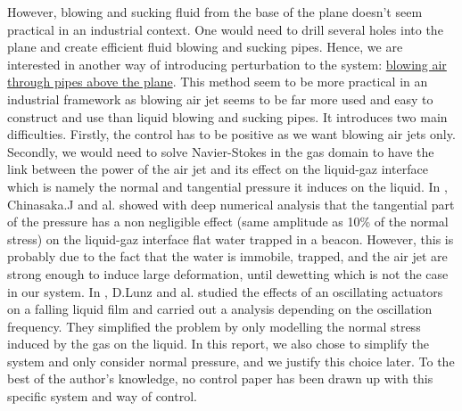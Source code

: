 \documentclass[12pt]{article}
\begin{document}
However, blowing and sucking fluid from the base of the plane doesn't seem practical in an industrial context. One would need to drill several holes into the plane and create efficient fluid blowing and sucking pipes. Hence, we are interested in another way of introducing perturbation to the system: \underline{blowing air through pipes above the plane}. This method seem to be more practical in an industrial framework as blowing air jet seems to be far more used and easy to construct and use than liquid blowing and sucking pipes. It introduces two main difficulties. Firstly, the control has to be positive as we want blowing air jets only. Secondly, we would need to solve Navier-Stokes in the gas domain to have the link between the power of the air jet and its effect on the liquid-gaz interface which is namely the normal and tangential pressure it induces on the liquid. In \cite{Dewetting_Ojiako}, Chinasaka.J and al. showed with deep numerical analysis that the tangential part of the pressure has a non negligible effect (same amplitude as 10\% of the normal stress) on the liquid-gaz interface flat water trapped in a beacon. However, this is probably due to the fact that the water is immobile, trapped, and the air jet are strong enough to induce large deformation, until dewetting which is not the case in our system.  
In \cite{Moving_pressure_source}, D.Lunz and al. studied the effects of an oscillating actuators on a falling liquid film and carried out a analysis depending on the oscillation frequency. They simplified the problem by only modelling the normal stress induced by the gas on the liquid.  In this report, we also chose to simplify the system and only consider normal pressure, and we justify this choice later. To the best of the author's knowledge, no control paper has been drawn up with this specific system and way of control. 
\\
\end{document}
